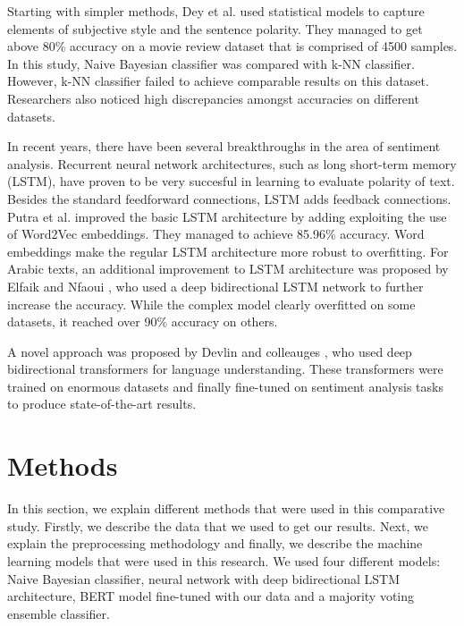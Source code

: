 \documentclass[conference]{IEEEtran}
\begin{document}
Starting with simpler methods, Dey \cite{naivebayes} et al. used statistical models to capture elements of subjective style and the sentence polarity. They managed to get above 80\% accuracy on a movie review dataset that is comprised of 4500 samples. In this study, Naive Bayesian classifier was compared with k-NN classifier. However, k-NN classifier failed to achieve comparable results on this dataset. Researchers also noticed high discrepancies amongst accuracies on different datasets.

In recent years, there have been several breakthroughs in the area of sentiment analysis. Recurrent neural network architectures, such as long short-term memory (LSTM), have proven to be very succesful in learning to evaluate polarity of text. Besides the standard feedforward connections, LSTM adds feedback connections. Putra et al. \cite{lstm} improved the basic LSTM architecture by adding exploiting the use of Word2Vec embeddings. They managed to achieve 85.96\% accuracy. Word embeddings make the regular LSTM architecture more robust to overfitting. For Arabic texts, an additional improvement to LSTM architecture was proposed by Elfaik and Nfaoui \cite{bilstm}, who used a deep bidirectional LSTM network to further increase the accuracy. While the complex model clearly overfitted on some datasets, it reached over 90\% accuracy on others.

A novel approach was proposed by Devlin and colleauges \cite{devlin2019bert}, who used deep bidirectional transformers for language understanding. These transformers were trained on enormous datasets and finally fine-tuned on sentiment analysis tasks to produce state-of-the-art results. 

\section{Methods}
In this section, we explain different methods that were used in this comparative study. Firstly, we describe the data that we used to get our results. Next, we explain the preprocessing methodology and finally, we describe the machine learning models that were used in this research. We used four different models: Naive Bayesian classifier, neural network with deep bidirectional LSTM architecture, BERT model fine-tuned with our data and a majority voting ensemble classifier.
\end{document}
